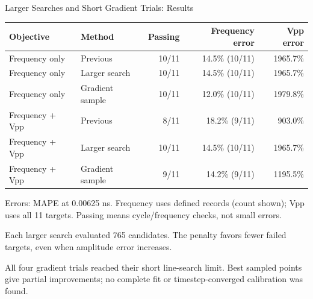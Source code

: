 \begin{frame}{Larger Searches and Short Gradient Trials: Results}
\centering\footnotesize
\renewcommand{\arraystretch}{1.15}
\begin{tabular}{@{}llrrr@{}}
\toprule
\textbf{Objective} & \textbf{Method} & \textbf{Passing} & \textbf{Frequency error} & \textbf{Vpp error}\\
\midrule
Frequency only & Previous & 10/11 & 14.5\% (10/11) & 1965.7\% \\
Frequency only & Larger search & 10/11 & 14.5\% (10/11) & 1965.7\% \\
Frequency only & Gradient sample & 10/11 & 12.0\% (10/11) & 1979.8\% \\
\midrule
Frequency + Vpp & Previous & 8/11 & 18.2\% (9/11) & 903.0\% \\
Frequency + Vpp & Larger search & 10/11 & 14.5\% (10/11) & 1965.7\% \\
Frequency + Vpp & Gradient sample & 9/11 & 14.2\% (9/11) & 1195.5\% \\
\bottomrule
\end{tabular}
\par\vspace{0.16cm}\scriptsize
Errors: MAPE at 0.00625 ns. Frequency uses defined records (count shown); Vpp uses all 11 targets. Passing means cycle/frequency checks, not small errors.
\par\vspace{0.12cm}\footnotesize
Each larger search evaluated 765 candidates. The penalty favors fewer failed targets, even when amplitude error increases.
\par\vspace{0.12cm}
All four gradient trials reached their short line-search limit. Best sampled points give partial improvements; no complete fit or timestep-converged calibration was found.
\end{frame}
